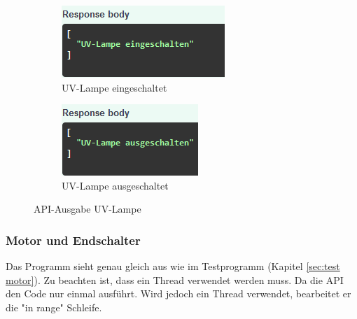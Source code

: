 \begin{figure}[htbp]
    \centering
    \begin{subfigure}[b]{0.4\textwidth}
        \centering
        \includegraphics[width=\textwidth]{image/uvlampe ein.png}
        \caption{UV-Lampe eingeschaltet}
        \label{fig:bild1}
    \end{subfigure}
    \hfill
    \begin{subfigure}[b]{0.35\textwidth}
        \centering
        \includegraphics[width=\textwidth]{image/UVLampe aus.png}
        \caption{UV-Lampe ausgeschaltet}
        \label{fig:bild2}
    \end{subfigure}
    \caption{API-Ausgabe UV-Lampe}
    \label{fig:zwei_bilder}
\end{figure}


\subsubsection{Motor und Endschalter}
Das Programm sieht genau gleich aus wie im Testprogramm (Kapitel \ref{sec:test motor}). Zu beachten ist, dass ein Thread verwendet werden muss. Da die API den Code nur einmal ausführt. Wird jedoch ein Thread verwendet, bearbeitet er die "in range" Schleife. 
